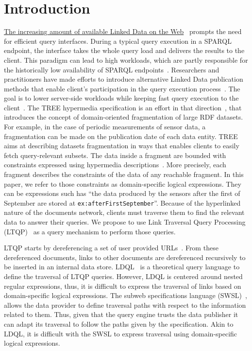 \section{Introduction}



\href{https://lod-cloud.net/#diagram}{The increasing amount of available Linked Data on the Web}~\cite{Ermilov2013} prompts the need for efficient query interfaces.
During a typical query execution in a SPARQL endpoint, the interface takes the whole query load and delivers the results to the client.
This paradigm can lead to high workloads, which are partly responsible for the historically low availability of SPARQL endpoints~\cite{aranda2013}.
Researchers and practitioners have made efforts to introduce alternative Linked Data publication methods that enable client's participation in the query execution process~\cite{Verborgh2016TriplePF}.
The goal is to lower server-side workloads while keeping fast query execution to the client~\cite{Azzam2021}.
The TREE hypermedia specification is an effort in that direction~\cite{ColpaertMaterializedTREE, lancker2021LDS}, that introduces the concept of domain-oriented fragmentation of large RDF datasets.
For example, in the case of periodic measurements of sensor data, a fragmentation can be made on the publication date of each data entity.
TREE aims at describing datasets fragmentation in ways that enables clients to easily fetch query-relevant subsets.
The data inside a fragment are bounded with constraints expressed using hypermedia descriptions~\cite{thomasFieldingPhdThesis}.
More precisely, each fragment describes the constraints of the data of any reachable fragment.
In this paper, we refer to those constraints as domain-specific logical expressions.
They can be expressions such has ``the data produced by the sensors after the first of September are stored at \texttt{ex:afterFirstSeptember}''.
Because of the hyperlinked nature of the documents network, clients must traverse them to find the relevant data to answer their queries.
We propose to use Link Traversal Query Processing (LTQP)~\cite{Hartig2016} as a query mechanism to perform those queries.

LTQP starts by dereferencing a set of user provided URLs~\cite{Hartig2016}.
From these dereferenced documents, links to other documents are dereferenced recursively to be inserted in an internal data store.
LDQL~\cite{hartig2016Ldql} is a theoretical query language to define the traversal of LTQP queries.
However, LDQL is centered around nested regular expressions, thus, it is difficult to express the traversal of links based on domain-specific logical expressions.
The subweb specifications language (SWSL)~\cite{bogaerts_rulemlrr_2021}, allows the data provider to define traversal paths with respect to the information related to them.
Thus, given that the query engine trusts the data publisher it can adapt its traversal to follow the paths given by the specification.
Akin to LDQL, it is difficult with the SWSL to express traversal using domain-specific logical expressions.

